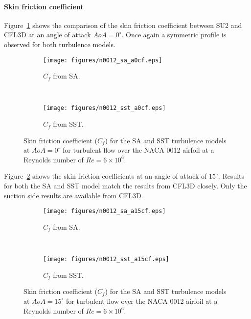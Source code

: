 \paragraph{Skin friction coefficient}
Figure~\ref{fig:tn012cfa0} shows the comparison of the skin friction coefficient between SU2 and CFL3D at an angle of attack $AoA=0^{\circ}$. Once again a symmetric profile is observed for both turbulence models.
\begin{figure}[h!]
    \centering
    \captionsetup{justification=centering}
    \begin{subfigure}[b]{0.48\textwidth}
    \captionsetup{justification=centering}
        \texttt{[image: figures/n0012\_sa\_a0cf.eps]}
        \caption{$C_f$ from SA.}
    \end{subfigure}
    ~ %
    \begin{subfigure}[b]{0.48\textwidth}
    \centering
    \captionsetup{justification=centering}
        \texttt{[image: figures/n0012\_sst\_a0cf.eps]}
        \caption{$C_f$ from SST.}
    \end{subfigure}
    \caption{Skin friction coefficient ($C_f$) for the SA and SST turbulence models at $AoA=0^{\circ}$ for turbulent flow over the NACA 0012 airfoil at a Reynolds number of $Re=6\times10^6$.}
    \label{fig:tn012cfa0}
\end{figure}
Figure~\ref{fig:tn012cfa15} shows the skin friction coefficients at an angle of attack of $15^{\circ}$. Results for both the SA and SST model match the results from CFL3D closely. Only the suction side results are available from CFL3D. 
\begin{figure}[h!]
    \centering
    \captionsetup{justification=centering}
    \begin{subfigure}[b]{0.48\textwidth}
    \captionsetup{justification=centering}
        \texttt{[image: figures/n0012\_sa\_a15cf.eps]}
        \caption{$C_f$ from SA.}
    \end{subfigure}
    ~ %
    \begin{subfigure}[b]{0.48\textwidth}
    \centering
    \captionsetup{justification=centering}
        \texttt{[image: figures/n0012\_sst\_a15cf.eps]}
        \caption{$C_f$ from SST.}
    \end{subfigure}
    \caption{Skin friction coefficient ($C_f$) for the SA and SST turbulence models at $AoA=15^{\circ}$ for turbulent flow over the NACA 0012 airfoil at a Reynolds number of $Re=6\times10^6$.}
     \label{fig:tn012cfa15}
\end{figure}

